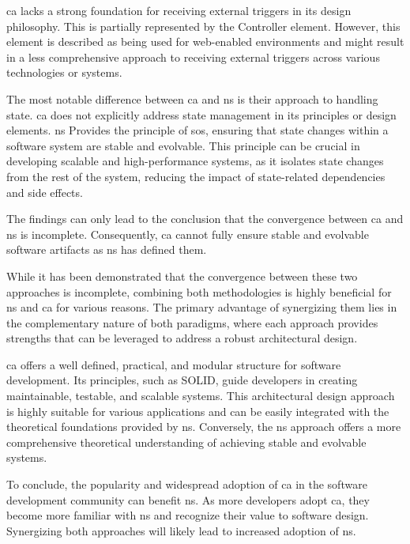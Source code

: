 \gls{ca} lacks a strong foundation for receiving external triggers in its design
philosophy. This is partially represented by the Controller element. However, this element
is described as being used for web-enabled environments and might result in a less
comprehensive approach to receiving external triggers across various technologies or
systems.

The most notable difference between \gls{ca} and \gls{ns} is their approach to handling
state. \gls{ca} does not explicitly address state management in its principles or design
elements. \gls{ns} Provides the principle of \gls{sos}, ensuring that state changes within
a software system are stable and evolvable. This principle can be crucial in developing
scalable and high-performance systems, as it isolates state changes from the rest of the
system, reducing the impact of state-related dependencies and side effects. 

The findings can only lead to the conclusion that the convergence between \gls{ca} and
\gls{ns} is incomplete.  Consequently, \gls{ca} cannot fully ensure stable and evolvable
software artifacts as \gls{ns} has defined them.

While it has been demonstrated that the convergence between these two approaches is
incomplete, combining both methodologies is highly beneficial for \gls{ns} and \gls{ca}
for various reasons. The primary advantage of synergizing them lies in the complementary
nature of both paradigms, where each approach provides strengths that can be leveraged to
address a robust architectural design. 

\gls{ca} offers a well defined, practical, and modular structure for software development.
Its principles, such as SOLID, guide developers in creating maintainable, testable, and
scalable systems. This architectural design approach is highly suitable for various
applications and can be easily integrated with the theoretical foundations provided by
\gls{ns}. Conversely, the \gls{ns} approach offers a more comprehensive theoretical
understanding of achieving stable and evolvable systems. 

To conclude, the popularity and widespread adoption of \gls{ca} in the software
development community can benefit \gls{ns}. As more developers adopt \gls{ca}, they become
more familiar with \gls{ns} and recognize their value to software design. Synergizing both
approaches will likely lead to increased adoption of \gls{ns}.
